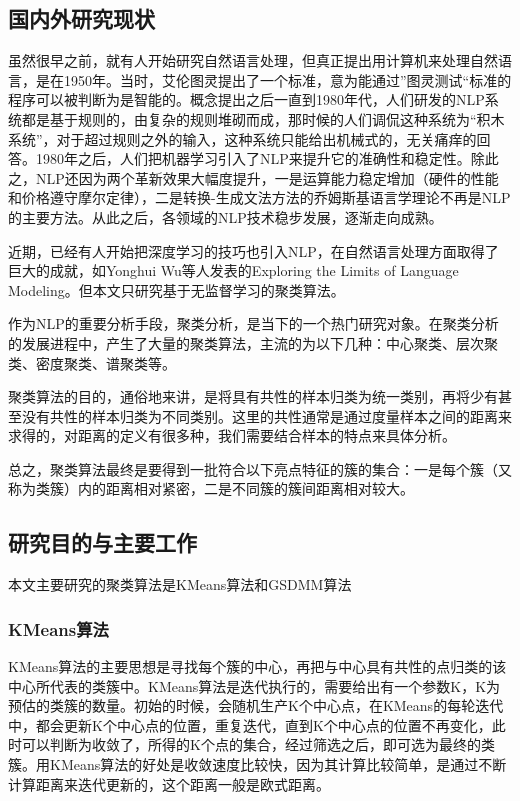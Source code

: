 \subsection{国内外研究现状}
虽然很早之前，就有人开始研究自然语言处理，但真正提出用计算机来处理自然语言，是在1950年。当时，艾伦图灵提出了一个标准，意为能通过”图灵测试“\cite{WEB:turing_test}标准的程序可以被判断为是智能的。概念提出之后一直到1980年代，人们研发的NLP系统都是基于规则的，由复杂的规则堆砌而成，那时候的人们调侃这种系统为“积木系统”，对于超过规则之外的输入，这种系统只能给出机械式的，无关痛痒的回答。1980年之后，人们把机器学习引入了NLP来提升它的准确性和稳定性。除此之，NLP还因为两个革新效果大幅度提升，一是运算能力稳定增加（硬件的性能和价格遵守摩尔定律），二是转换-生成文法方法的乔姆斯基语言学理论不再是NLP的主要方法\cite{WEB:turing_test}。从此之后，各领域的NLP技术稳步发展，逐渐走向成熟。

近期，已经有人开始把深度学习的技巧也引入NLP，在自然语言处理方面取得了巨大的成就，如Yonghui Wu等人发表的Exploring the Limits of Language Modeling\cite{DBLP:journals/corr/JozefowiczVSSW16}。但本文只研究基于无监督学习的聚类算法。

作为NLP的重要分析手段，聚类分析，是当下的一个热门研究对象。在聚类分析的发展进程中，产生了大量的聚类算法，主流的为以下几种：中心聚类、层次聚类、密度聚类、谱聚类等。

聚类算法的目的，通俗地来讲，是将具有共性的样本归类为统一类别，再将少有甚至没有共性的样本归类为不同类别。这里的共性通常是通过度量样本之间的距离来求得的，对距离的定义有很多种，我们需要结合样本的特点来具体分析。\cite{ZW:cluster_alg_study_compare}

总之，聚类算法最终是要得到一批符合以下亮点特征的簇的集合：一是每个簇（又称为类簇）内的距离相对紧密，二是不同簇的簇间距离相对较大。

\subsection{研究目的与主要工作}
本文主要研究的聚类算法是KMeans\cite{Macqueen67somemethods}算法和GSDMM\cite{Yin:2014:DMM:2623330.2623715}算法

\subsubsection{KMeans算法}

KMeans算法的主要思想是寻找每个簇的中心，再把与中心具有共性的点归类的该中心所代表的类簇中。KMeans算法是迭代执行的，需要给出有一个参数K，K为预估的类簇的数量。初始的时候，会随机生产K个中心点，在KMeans的每轮迭代中，都会更新K个中心点的位置，重复迭代，直到K个中心点的位置不再变化，此时可以判断为收敛了，所得的K个点的集合，经过筛选之后，即可选为最终的类簇。用KMeans算法的好处是收敛速度比较快，因为其计算比较简单，是通过不断计算距离来迭代更新的，这个距离一般是欧式距离。

